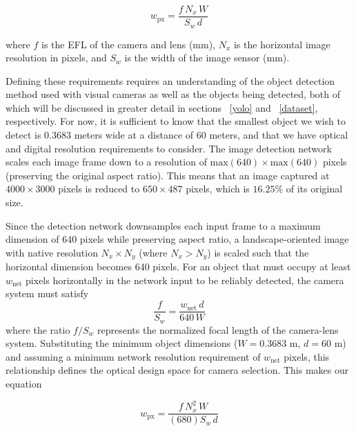 \documentclass{erauthesis}
\begin{document}
\begin{equation}
w_{\text{px}} = \frac{f \, N_x \, W}{S_w \, d}
\end{equation}

where $f$ is the \ac{EFL} of the camera and lens (mm), $N_x$ is the horizontal image resolution in pixels, and $S_w$ is the width of the image sensor (mm). 

Defining these requirements requires an understanding of the object detection method used with visual cameras as well as the objects being detected, both of which will be discussed in greater detail in sections ~\ref{yolo} and ~\ref{dataset}, respectively.
For now, it is sufficient to know that the smallest object we wish to detect is $0.3683$ meters wide at a distance of 60 meters, and that we have optical and digital resolution requirements to consider.
The image detection network scales each image frame down to a resolution of $\text{max}(640) \times \text{max}(640)$ pixels (preserving the original aspect ratio).
This means that an image captured at $4000 \times 3000$ pixels is reduced to $650 \times 487$ pixels, which is $16.25\%$ of its original size. 


Since the detection network downsamples each input frame to a maximum dimension of 640 pixels while preserving aspect ratio, a landscape-oriented image with native resolution $N_x \times N_y$ (where $N_x > N_y$) is scaled such that the horizontal dimension becomes 640 pixels.
For an object that must occupy at least $w_{\text{net}}$ pixels horizontally in the network input to be reliably detected, the camera system must satisfy
  \begin{equation}
  \frac{f}{S_w} = \frac{w_{\text{net}} \, d}{640 \, W}
  \end{equation}
where the ratio $f/S_w$ represents the normalized focal length of the camera-lens system.
Substituting the minimum object dimensions ($W = 0.3683$ m, $d = 60$ m) and assuming a minimum network resolution requirement of $w_{\text{net}}$ pixels, this relationship defines the optical design space for camera selection.
This makes our equation

\begin{equation}
w_{\text{px}} = \frac{f \, N_x^2 \, W}{(680)S_w \, d}
\end{equation}
\end{document}

